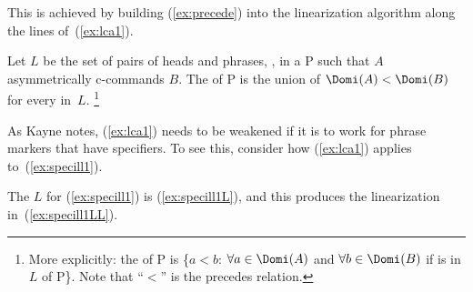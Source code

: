 \documentclass[output=paper]{langsci/langscibook}
\begin{document}
This is achieved by building (\ref{ex:precede}) into the linearization
algorithm along the lines of~(\ref{ex:lca1}).
\begin{exe}
	\ex \label{ex:lca1}
	\begin{xlist}
		\ex Let $L$ be the set of pairs of heads and phrases, , in a  P such that $A$ asymmetrically c-commands $B$.
		\ex The  of P is the union of $\Domi(A) < \Domi(B)$ for every  in~$L$.%
		\footnote{More explicitly: the  of P is \{$a<b$: $\forall a \in \Domi(A)$ and $\forall b \in \Domi(B)$ if  is in $L$ of P\}. Note that ``$<$'' is the precedes relation.} %
	\end{xlist}
\end{exe}

As Kayne notes, (\ref{ex:lca1}) needs to be weakened if it is to work for
phrase markers that have specifiers. To see this, consider how (\ref{ex:lca1})
applies to~(\ref{ex:specill1}).

\ea\label{ex:specill1}
\z

The $L$ for (\ref{ex:specill1}) is (\ref{ex:specill1L}), and this produces the
linearization in~(\ref{ex:specill1LL}).
\end{document}
